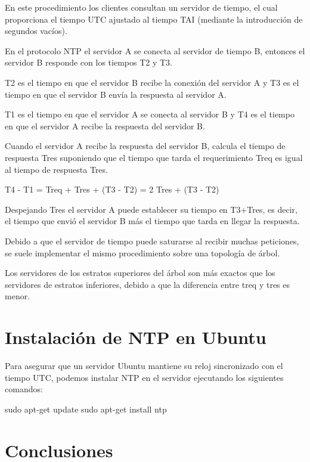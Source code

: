 \documentclass[11pt,a4paper,oneside]{book}
\begin{document}
En este procedimiento los clientes consultan un servidor de tiempo, el cual proporciona el tiempo UTC ajustado al tiempo TAI (mediante la introducción de segundos vacíos).

En el protocolo NTP el servidor A se conecta al servidor de tiempo B, entonces el servidor B responde con los tiempos T2 y T3.

T2 es el tiempo en que el servidor B recibe la conexión del servidor A y T3 es el tiempo en que el servidor B envía la respuesta al servidor A.

T1 es el tiempo en que el servidor A se conecta al servidor B y T4 es el tiempo en que el servidor A recibe la respuesta del servidor B.

Cuando el servidor A recibe la respuesta del servidor B, calcula el tiempo de respuesta Tres suponiendo que el tiempo que tarda el requerimiento Treq es igual al tiempo de respuesta Tres.

\begin{SourceCode}
T4 - T1 = Treq + Tres + (T3 - T2) = 2 Tres + (T3 - T2)
\end{SourceCode}

Despejando Tres el servidor A puede establecer su tiempo en T3+Tres, es decir, el tiempo que envió el servidor B más el tiempo que tarda en llegar la respuesta.

Debido a que el servidor de tiempo puede saturarse al recibir muchas peticiones,  se suele implementar el mismo procedimiento sobre una topología de árbol.

Los servidores de los estratos superiores del árbol son más exactos que los servidores de estratos inferiores, debido a que la diferencia entre treq y tres es menor.

\section{Instalación de NTP en Ubuntu}

Para asegurar que un servidor Ubuntu mantiene su reloj sincronizado con el tiempo UTC, podemos instalar NTP en el servidor ejecutando los siguientes comandos:

\begin{SourceCode}
sudo apt-get update
sudo apt-get install ntp
\end{SourceCode}

\section{Conclusiones}
\end{document}
